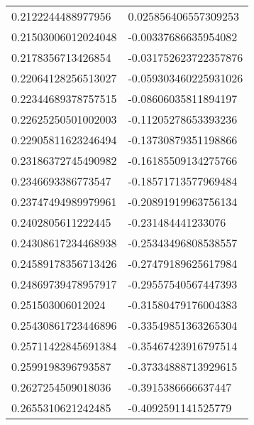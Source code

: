 \begin{supertabular}{ll}
0.2122244488977956  & 0.025856406557309253  \\
0.21503006012024048 & -0.00337686635954082  \\
0.2178356713426854  & -0.031752623722357876 \\
0.22064128256513027 & -0.059303460225931026 \\
0.22344689378757515 & -0.08606035811894197  \\
0.22625250501002003 & -0.11205278653393236  \\
0.22905811623246494 & -0.13730879351198866  \\
0.23186372745490982 & -0.16185509134275766  \\
0.2346693386773547  & -0.18571713577969484  \\
0.23747494989979961 & -0.20891919963756134  \\
0.2402805611222445  & -0.231484441233076    \\
0.24308617234468938 & -0.25343496808538557  \\
0.24589178356713426 & -0.27479189625617984  \\
0.24869739478957917 & -0.29557540567447393  \\
0.251503006012024   & -0.31580479176004383  \\
0.25430861723446896 & -0.33549851363265304  \\
0.25711422845691384 & -0.35467423916797514  \\
0.2599198396793587  & -0.37334888713929615  \\
0.2627254509018036  & -0.3915386666637447   \\
0.2655310621242485  & -0.4092591141525779   \\
\end{supertabular}
